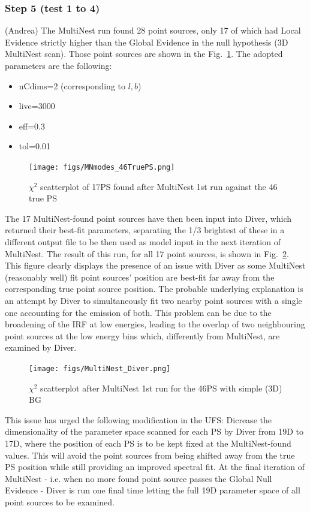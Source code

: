 \documentclass{article}
\begin{document}
\subsubsection*{Step 5 (test 1 to 4)}
(Andrea) The MultiNest run found 28 point sources, only 17 of which had Local Evidence strictly higher than the Global 
Evidence in the null hypothesis (3D MultiNest scan). Those point sources are shown in the Fig.~\ref{fig:17MN}. The adopted parameters are the following:
\begin{itemize} 
\item nCdims=2 (corresponding to $l,b$)
\item live=3000
\item eff=0.3
\item tol=0.01
\end{itemize}
\begin{figure}[h]
\centering
\texttt{[image: figs/MNmodes\_46TruePS.png]}
\caption{$\chi^{2}$ scatterplot of 17PS found after MultiNest 1st run against the 46 true PS}
\label{fig:17MN}
\end{figure}
The 17 MultiNest-found point sources have then been input into Diver, which returned their best-fit parameters, separating 
the 1/3 brightest of these in a different output file to be then used as model input in the next iteration of MultiNest. The result 
of this run, for all 17 point sources, is shown in Fig.~\ref{fig:6Diver}. This figure clearly displays the presence of an issue with Diver as 
some MultiNest (reasonably well) fit point sources' position are best-fit far away from the corresponding true point source position. 
The probable underlying explanation is an attempt by Diver to simultaneously fit two nearby point sources with a single one accounting 
for the emission of both. This problem can be due to the broadening of the IRF at low energies, leading to the overlap of two 
neighbouring point sources at the low energy bins which, differently from MultiNest, are examined by Diver. \newline
\begin{figure}[h]
\centering
\texttt{[image: figs/MultiNest\_Diver.png]}
\caption{$\chi^{2}$ scatterplot after MultiNest 1st run for the 46PS with simple (3D) BG}
\label{fig:6Diver}
\end{figure}
This issue has urged the following modification in the UFS: Dicrease the dimensionality of the parameter space scanned for each 
PS by Diver from 19D to 17D, where the position of each PS is to be kept fixed at the MultiNest-found values. This will avoid the point 
sources from being shifted away from the true PS position while still providing an improved spectral fit. At the final iteration of 
MultiNest - i.e. when no more found point source passes the Global Null Evidence - Diver is run one final time letting the full 
19D parameter space of all point sources to be examined.
\end{document}
